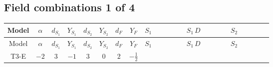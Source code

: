 \documentclass[8pt]{article}
\begin{document}
\begin{landscape}
\subsection*{Field combinations 1 of 4}
\begin{longtable}{@{}cccccccc >{\raggedright\arraybackslash}p{0.21\linewidth} >{\raggedright\arraybackslash}p{0.21\linewidth} >{\raggedright\arraybackslash}p{0.21\linewidth}@{}}
\toprule
Model & $\alpha$ & $d_{S_1}$ & $Y_{S_1}$ & $d_{S_2}$ & $Y_{S_2}$ & $d_F$ & $Y_F$ & $S_1$ & $S_1\,D$ & $S_2$ \\
\midrule
\endfirsthead
\toprule
Model & $\alpha$ & $d_{S_1}$ & $Y_{S_1}$ & $d_{S_2}$ & $Y_{S_2}$ & $d_F$ & $Y_F$ & $S_1$ & $S_1\,D$ & $S_2$ \\
\midrule
\endhead
T3-E & $-2$ & $3$ & $-1$ & $3$ & $0$ & $2$ & $-\frac{1}{2}$ & \scriptsize\adjustbox{max width=\linewidth}{$\begin{gathered} -S_{1,j_1} S_{1,j_1}{}^{\dagger } m_1^2 \\ +\frac{1}{2} S_{1,j_3} S_{1,j_4} S_{1,j_1}{}^{\dagger } S_{1,j_2}{}^{\dagger } \mathcal{I}_{S_1,j_1,j_3,j_2,j_4}{}^1 \lambda_{S_1}^{(1)}^{(1)} \\ +\frac{1}{2} S_{1,j_3} S_{1,j_4} S_{1,j_1}{}^{\dagger } S_{1,j_2}{}^{\dagger } \mathcal{I}_{S_1,j_1,j_3,j_2,j_4}{}^2 \lambda_{S_1}^{(1)}^{(2)}\end{gathered}$} & \scriptsize\adjustbox{max width=\linewidth}{$\begin{gathered} +D_{\mu _1}\left(S_{1,j_1}\right){}^{\dagger } D_{\mu _1}\left(S_{1,j_1}\right)\end{gathered}$} & \scriptsize\adjustbox{max width=\linewidth}{$\begin{gathered} -m_2^2 S_{2,j_1} S_{2,j_1}{}^{\dagger } \\ +\frac{1}{2} S_{2,j_3} S_{2,j_4} S_{2,j_1}{}^{\dagger } S_{2,j_2}{}^{\dagger } \mathcal{I}_{S_2,j_1,j_3,j_2,j_4}{}^1 \lambda_{S_2}^{(1)}^{(1)} \\ +\frac{1}{2} S_{2,j_3} S_{2,j_4} S_{2,j_1}{}^{\dagger } S_{2,j_2}{}^{\dagger } \mathcal{I}_{S_2,j_1,j_3,j_2,j_4}{}^2 \lambda_{S_2}^{(1)}^{(2)}\end{gathered}$} \\
\midrule
\bottomrule
\end{longtable}
\clearpage

\end{landscape}
\end{document}
